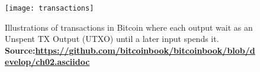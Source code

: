 \begin{figure}[!htbp]
    \centering
    \texttt{[image: transactions]}
    \caption[Illustrations of transactions in Bitcoin where each output wait as an Unspent TX Output (UTXO) until a later input spends it]
    {Illustrations of transactions in Bitcoin where each output wait as an Unspent TX Output (UTXO) until a later input spends it. \\  \textbf{Source:\url{https://github.com/bitcoinbook/bitcoinbook/blob/develop/ch02.asciidoc}}
    }
    \label{fig:transaction}
\end{figure}
    